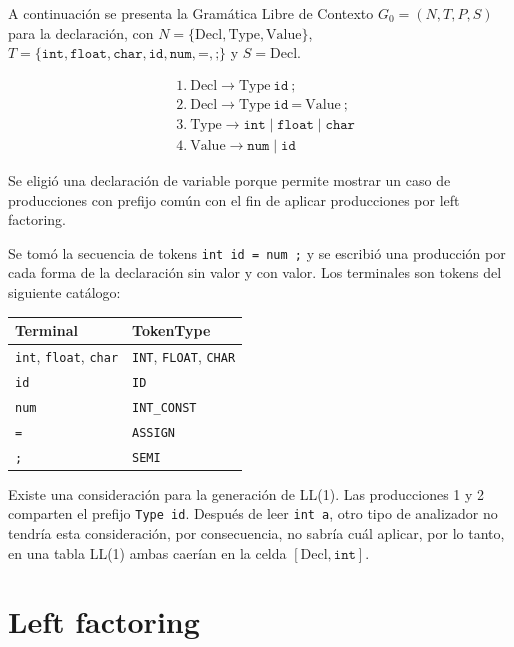 \documentclass[12pt,letterpaper]{article}
\newcommand{\cd}[1]{\texttt{#1}}                       %
\begin{document}
A continuación se presenta la Gramática Libre de Contexto $G_0 = (N, T, P, S)$ para la declaración, con $N = \{\text{Decl}, \text{Type}, \text{Value}\}$, $T = \{\texttt{int}, \texttt{float}, \texttt{char}, \texttt{id}, \texttt{num}, \texttt{=}, \texttt{;}\}$ y $S = \text{Decl}$.

\begin{align*}
&1.\ \text{Decl} \rightarrow \text{Type}\ \texttt{id}\ \texttt{;} \\
&2.\ \text{Decl} \rightarrow \text{Type}\ \texttt{id}\ \texttt{=}\ \text{Value}\ \texttt{;} \\
&3.\ \text{Type} \rightarrow \texttt{int} \mid \texttt{float} \mid \texttt{char} \\
&4.\ \text{Value} \rightarrow \texttt{num} \mid \texttt{id}
\end{align*}

Se eligió una declaración de variable porque permite mostrar un caso de producciones con prefijo común con el fin de aplicar producciones por left factoring.

Se tomó la secuencia de tokens \cd{int id = num ;} y se escribió una producción por cada forma de la declaración sin valor y con valor. Los terminales son tokens del siguiente catálogo:

\begin{center}
\small
\begin{tabular}{@{}l l@{}}
\toprule
\textbf{Terminal} & \textbf{TokenType} \\
\midrule
\cd{int}, \cd{float}, \cd{char} & \cd{INT}, \cd{FLOAT}, \cd{CHAR} \\
\cd{id}  & \cd{ID} \\
\cd{num} & \cd{INT\_CONST} \\
\cd{=}   & \cd{ASSIGN} \\
\cd{;}   & \cd{SEMI} \\
\bottomrule
\end{tabular}
\end{center}

Existe una consideración para la generación de LL(1). Las producciones 1 y 2 comparten el prefijo \cd{Type id}. Después de leer \cd{int a}, otro tipo de analizador no tendría esta consideración, por consecuencia, no sabría cuál aplicar, por lo tanto, en una tabla LL(1) ambas caerían en la celda $[\text{Decl}, \texttt{int}]$.


\section{Left factoring}
\end{document}
